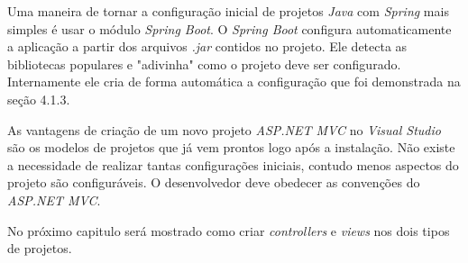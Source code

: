 Uma maneira de tornar a configuração inicial de projetos \textit{Java} com \textit{Spring} mais simples é usar o módulo \textit{Spring Boot}. O \textit{Spring Boot} configura automaticamente a aplicação a partir dos arquivos \textit{.jar} contidos no projeto. Ele detecta as bibliotecas populares e "adivinha" como o projeto deve ser configurado. Internamente ele cria de forma automática a configuração que foi demonstrada na seção 4.1.3.

As vantagens de criação de um novo projeto \textit{ASP.NET MVC} no \textit{Visual Studio} são os modelos de projetos que já vem prontos logo após a instalação. Não existe a necessidade de realizar tantas configurações iniciais, contudo menos aspectos do projeto são configuráveis. O desenvolvedor deve obedecer as convenções do \textit{ASP.NET MVC}.

No próximo capitulo será mostrado como criar \textit{controllers} e \textit{views} nos dois tipos de projetos.